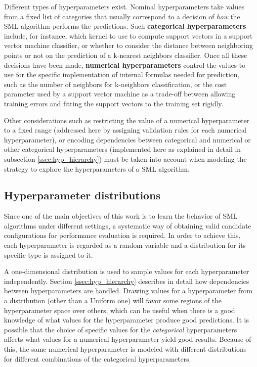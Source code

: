 	Different types of hyperparameters exist. Nominal hyperparameters take values from a fixed
	list of categories that usually correspond to a decision of \emph{how} the SML algorithm
	performs the predictions. Such {\bf categorical hyperparameters} include, for instance, which
	kernel to use to compute support vectors in a support vector machine classifier, or whether to
	consider the distance between neighboring points or not on the prediction of a k-nearest
	neighbors classifier. Once all these decisions have been made, {\bf numerical hyperparameters}
	control the values to use for the specific implementation of internal formulas needed for
	prediction, such as the number of neighbors for k-neighbors classification, or the cost
	parameter used by a support vector machine as a trade-off between allowing training errors and
	fitting the support vectors to the training set rigidly.

	Other considerations such as restricting the value of a numerical hyperparameter to a fixed
	range (addressed here by assigning validation rules for each numerical hyperparameter), or
	encoding dependencies between categorical and numerical or other categorical hyperparameters
	(implemented here as explained in detail in subsection \ref{ssec:hyp_hierarchy}) must be taken
	into account when modeling the strategy to explore the hyperparameters of a SML algorithm.

	\subsection{Hyperparameter distributions}
	\label{ssec:hyperparam_dist}
	Since one of the main objectives of this work is to learn the behavior of SML algorithms under
	different settings, a systematic way of obtaining valid candidate configurations for performance
	evaluation is required. In order to achieve this, each hyperparameter is regarded as a random
	variable and a distribution for its specific type is assigned to it.

	A one-dimensional distribution is used to sample values for each hyperparameter
	independently. Section \ref{ssec:hyp_hierarchy} describes in detail how dependencies between
	hyperparameters are handled. Drawing values for a hyperparameter from a distribution (other than
	a Uniform one) will favor some regions of the hyperparameter space over others, which can be
	useful when there is a good knowledge of what values for the hyperparameter produce good
	predictions.  It is possible that the choice of specific values for the \emph{categorical}
	hyperparameters affects what values for a numerical hyperparameter yield good results. Because
	of this, the same numerical hyperparameter is modeled with different distributions for different
	combinations of the categorical hyperparameters.

